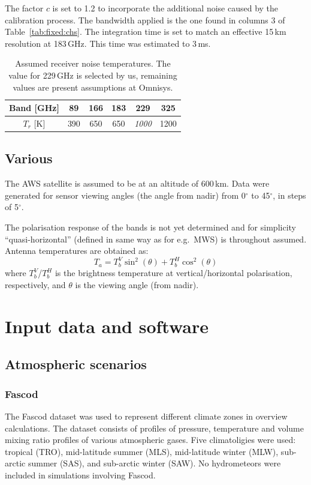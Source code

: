 \documentclass[12pt]{article}
\begin{document}
The factor $c$ is set to 1.2 to incorporate the additional noise caused by the
calibration process. The bandwidth applied is the one found in columns 3 of
Table~\ref{tab:fixed:chs}. The integration time is set to match an effective
15\,km resolution at 183\,GHz. This time was estimated to 3\,ms. 

\begin{table}[!bt]
  \centering
  \begin{tabular}[b]{c|ccccc}
    Band [GHz]   & 89 & 166 & 183 & 229 & 325 \\
    \hline
    $T_r$ [K]    & 390 & 650 & 650 & {\it 1000}  & 1200 \\
    \hline
  \end{tabular}
  \caption{Assumed receiver noise temperatures. The value for 229\,GHz is
    selected by us, remaining values are present assumptions at Omnisys.}
  \label{tab:trec}
\end{table}

\subsection{Various}
%
The AWS satellite is assumed to be at an altitude of 600\,km. Data were
generated for sensor viewing angles (the angle from nadir) from 0$^\circ$ to
45$^\circ$, in steps of 5$^\circ$.

The polarisation response of the bands is not yet determined and for simplicity
``quasi-horizontal'' (defined in same way as for e.g.\ MWS) is throughout
assumed. Antenna temperatures are obtained as:
\begin{equation}
  \label{eq:polrot}
  T_a = T_b^V\sin^2(\theta) + T_b^H\cos^2(\theta)
\end{equation}
where $T_b^V$/$T_b^H$ is the brightness temperature at vertical/horizontal
polarisation, respectively, and $\theta$ is the viewing angle (from nadir).



\section{Input data and software}

\subsection{Atmospheric scenarios}

\subsubsection{Fascod}
\label{sec:fascod}
%
The Fascod dataset \citep{anderson1986afgl} was used to represent different
climate zones in overview calculations. The dataset consists of profiles of
pressure, temperature and volume mixing ratio profiles of various atmospheric
gases. Five climatoligies were used: tropical (TRO), mid-latitude summer (MLS),
mid-latitude winter (MLW), sub-arctic summer (SAS), and sub-arctic winter
(SAW). No hydrometeors were included in simulations involving Fascod.
\end{document}
